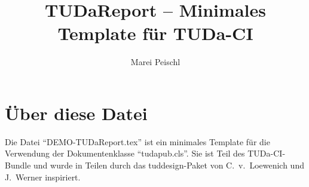 \documentclass[
	german,%
	accentcolor=9c,%
	type=intern, %
	marginpar=false,%
]{tudapub}
\title{TUDaReport -- Minimales Template für TUDa-CI}
\author{Marei Peischl}
\begin{document}
\maketitle


\tableofcontents


\section{Über diese Datei}

Die Datei \enquote{DEMO-TUDaReport.tex} ist ein minimales Template für die Verwendung der Dokumentenklasse \enquote{tudapub.cls}.
Sie ist Teil des TUDa-CI-Bundle und wurde in Teilen durch das tuddesign-Paket von C.~v.~Loewenich und J.~Werner inspiriert.
\end{document}
